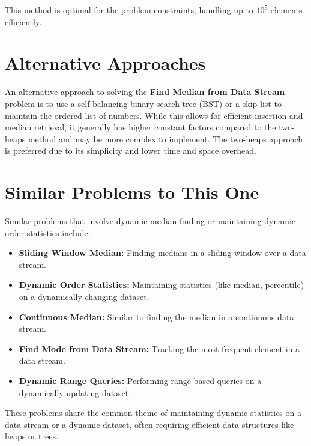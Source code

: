 This method is optimal for the problem constraints, handling up to \(10^5\) elements efficiently.

\section*{Alternative Approaches}

An alternative approach to solving the \textbf{Find Median from Data Stream} problem is to use a self-balancing binary search tree (BST) or a skip list to maintain the ordered list of numbers. While this allows for efficient insertion and median retrieval, it generally has higher constant factors compared to the two-heaps method and may be more complex to implement. The two-heaps approach is preferred due to its simplicity and lower time and space overhead.

\section*{Similar Problems to This One}

Similar problems that involve dynamic median finding or maintaining dynamic order statistics include:

\begin{itemize}
    \item \textbf{Sliding Window Median:} Finding medians in a sliding window over a data stream.
    
    \item \textbf{Dynamic Order Statistics:} Maintaining statistics (like median, percentile) on a dynamically changing dataset.
    
    \item \textbf{Continuous Median:} Similar to finding the median in a continuous data stream.
    
    \item \textbf{Find Mode from Data Stream:} Tracking the most frequent element in a data stream.
    
    \item \textbf{Dynamic Range Queries:} Performing range-based queries on a dynamically updating dataset.
\end{itemize}

These problems share the common theme of maintaining dynamic statistics on a data stream or a dynamic dataset, often requiring efficient data structures like heaps or trees.

